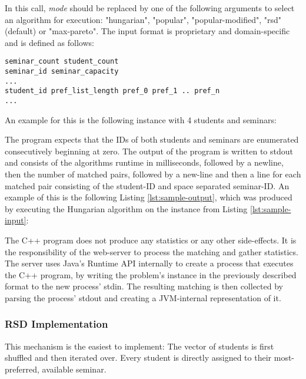 In this call, \emph{mode} should be replaced by one of the following arguments to select an algorithm for execution: "hungarian", "popular", "popular-modified", "rsd" (default) or "max-pareto". The input format is proprietary and domain-specific and is defined as follows:
\begin{lstlisting}[frame=single, caption={Program input format},captionpos=b]
seminar_count student_count
seminar_id seminar_capacity
...
student_id pref_list_length pref_0 pref_1 .. pref_n
...
\end{lstlisting}

An example for this is the following instance with 4 students and seminars:


The program expects that the IDs of both students and seminars are enumerated consecutively beginning at zero. The output of the program is written to stdout and consists of the algorithms runtime in milliseconds, followed by a newline, then the number of matched pairs, followed by a new-line and then a line for each matched pair consisting of the student-ID and space separated seminar-ID. An example of this is the following Listing \ref{lst:sample-output}, which was produced by executing the Hungarian algorithm on the instance from Listing \ref{lst:sample-input}:


The C++ program does not produce any statistics or any other side-effects. It is the responsibility of the web-server to process the matching and gather statistics. The server uses Java's Runtime API internally to create a process that executes the C++ program, by writing the problem's instance in the previously described format to the new process' stdin. The resulting matching is then collected by parsing the process' stdout and creating a JVM-internal representation of it. 

\subsubsection{RSD Implementation}
This mechanism is the easiest to implement: The vector of students is first shuffled and then iterated over. Every student is directly assigned to their most-preferred, available seminar.

